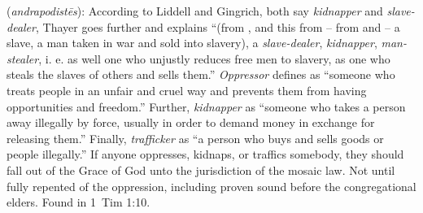 \item[Oppressor,]

(\textit{andrapodistēs}):
According to Liddell and Gingrich, both say \emph{kidnapper} and \emph{slave-dealer}, Thayer goes further and explains ``(from , and this from  -- from  and  -- a slave, a man taken in war and sold into slavery), a \emph{slave-dealer}, \emph{kidnapper}, \emph{man-stealer}, i. e. as well one who unjustly reduces free men to slavery, as one who steals the slaves of others and sells them.'' \emph{Oppressor} defines as ``someone who treats people in an unfair and cruel way and prevents them from having opportunities and freedom.'' Further, \emph{kidnapper} as ``someone who takes a person away illegally by force, usually in order to demand money in exchange for releasing them.'' Finally, \emph{trafficker} as ``a person who buys and sells goods or people illegally.'' If anyone oppresses, kidnaps, or traffics somebody, they should fall out of the Grace of God unto the jurisdiction of the mosaic law. Not until fully repented of the oppression, including proven sound before the congregational elders.
Found in 1~Tim 1:10.
